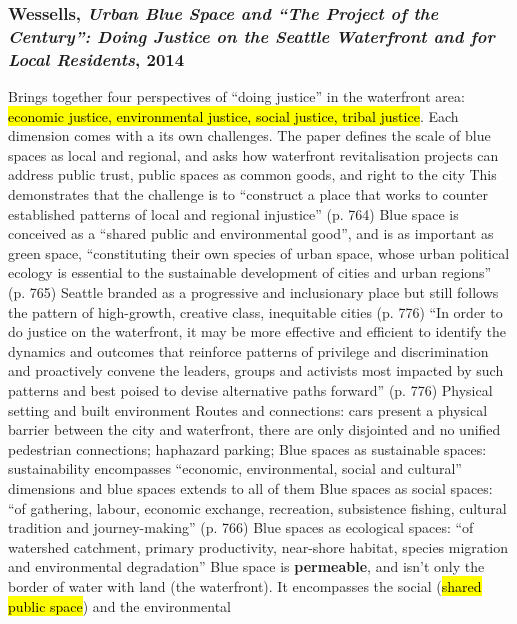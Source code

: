 \documentclass{article}
\begin{document}
\subsubsection{Wessells, \textit{Urban Blue Space and ``The Project of the Century'': Doing Justice on the Seattle Waterfront and for Local Residents}, 2014}

\parencite{wessells2014urban}

\begin{outline}
	\1 Brings together four perspectives of ``doing justice'' in the waterfront area: \hl{economic justice, environmental justice, social justice, tribal justice}. Each dimension comes with a its own challenges. The paper defines the scale of blue spaces as local and regional, and asks how waterfront revitalisation projects can address public trust, public spaces as common goods, and right to the city
		\2 This demonstrates that the challenge is to ``construct a place that works to counter established patterns of local and regional injustice'' (p. 764)
		\2 Blue space is conceived as a ``shared public and environmental good'', and is as important as green space, ``constituting their own species of urban space, whose urban political ecology is essential to the sustainable development of cities and urban regions'' (p. 765)
		\2 Seattle branded as a progressive and inclusionary place but still follows the pattern of high-growth, creative class, inequitable cities (p. 776)
		\2 ``In order to do justice on the waterfront, it may be more effective and efficient to identify the dynamics and outcomes that reinforce patterns of privilege and discrimination and proactively convene the leaders, groups and activists most impacted by such patterns and best poised to devise alternative paths forward'' (p. 776)
	\1 Physical setting and built environment
		\2 Routes and connections: cars present a physical barrier between the city and waterfront, there are only disjointed and no unified pedestrian connections; haphazard parking; 
	\1 Blue spaces as sustainable spaces: sustainability encompasses ``economic, environmental, social and cultural'' dimensions and blue spaces extends to all of them
		\2 Blue spaces as social spaces: ``of gathering, labour, economic exchange, recreation, subsistence fishing, cultural tradition and journey-making'' (p. 766)
		\2 Blue spaces as ecological spaces: ``of watershed catchment, primary productivity, near-shore habitat, species migration and environmental degradation'' 
		\2 Blue space is \textbf{permeable}, and isn't only the border of water with land (the waterfront). It encompasses the social (\hl{shared public space}) and the environmental

\end{outline}
\end{document}

